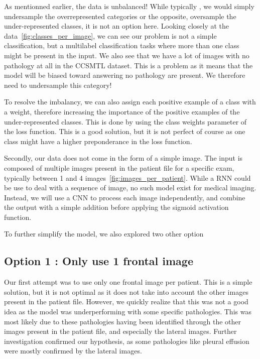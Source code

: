 \documentclass[11pt]{article}
\begin{document}
   

    As mentionned earlier, the data is unbalanced! While typically , we would simply undersample the overrepresented
    categories or the opposite, oversample the under-represented classes, it is not an option here. Looking closely at the data~\ref{fig:classes_per_image},
    we can see our problem is not a simple classification, but a multilabel classification tasks where more than one class might be present
    in the input. We also see that we have a lot of images with no pathology at all in the CCSMTL dataset. This is a 
    problem as it means that the model will be biased toward answering no pathology are present. We therefore need 
    to undersample this category!



    To resolve the imbalancy, we can also assign each positive example of a class with a weight, therefore increasing the importance of the positive examples of the under-represented classes. This is
    done by using the class weights parameter of the loss function. This is a good solution, but it is not perfect of course as one class might have a higher preponderance in the loss
    function.
    
    Secondly, our data does not come in the form of a simple image. The input is composed of multiple images present 
    in the patient file for a specific exam, typically between 1 and 4 images~\ref{fig:images_per_patient}. While a RNN could be use to deal
    with a sequence of image, no such model exist for medical imaging. Instead, we will use a CNN to process each image independently, and combine the output with a simple addition before applying the sigmoid activation function.

    To further simplify the model, we also explored two other option



    \subsection{Option 1 : Only use 1 frontal image}
        Our first attempt was to use only one frontal image per patient. This is a simple solution, but it is not optimal as it does not take into account the other images present in the patient file.
        However, we quickly realize that this was not a good idea as the model was underperforming with some specific pathologies. This was most
        likely due to these pathologies having been identified through the other images present in the patient file, and especially the lateral images.
        Further investigation confirmed our hypothesis, as some pathologies like pleural effusion were mostly confirmed by the lateral images.
\end{document}
